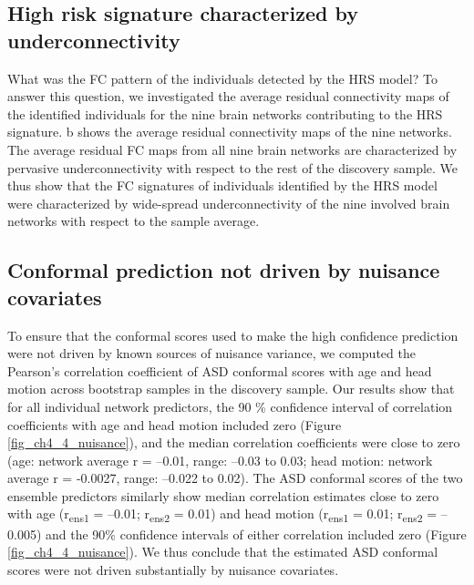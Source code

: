 \documentclass[9pt,lineno]{elife}
\begin{document}
\subsection{High risk signature characterized by underconnectivity}
What was the FC pattern of the individuals detected by the HRS model? To answer this question, we investigated the average residual connectivity maps of the identified individuals for the nine brain networks contributing to the HRS signature. b shows the average residual connectivity maps of the nine networks. The average residual FC maps from all nine brain networks are characterized by pervasive underconnectivity with respect to the rest of the discovery sample. We thus show that the FC signatures of individuals identified by the HRS model were characterized by wide-spread underconnectivity of the nine involved brain networks with respect to the sample average.

\subsection{Conformal prediction not driven by nuisance covariates}
To ensure that the conformal scores used to make the high confidence prediction were not driven by known sources of nuisance variance, we computed the Pearson’s correlation coefficient of ASD conformal scores with age and head motion across bootstrap samples in the discovery sample. Our results show that for all individual network predictors, the 90 \% confidence interval of correlation coefficients with age and head motion included zero (Figure \ref{fig_ch4_4_nuisance}), and the median correlation coefficients were close to zero (age: network average r = –0.01, range: –0.03 to 0.03; head motion: network average r = -0.0027, range: –0.022 to 0.02). The ASD conformal scores of the two ensemble predictors similarly show median correlation estimates close to zero with age (r\textsubscript{ens1} = –0.01; r\textsubscript{ens2} = 0.01) and head motion (r\textsubscript{ens1} = 0.01; r\textsubscript{ens2} = –0.005) and the 90\% confidence intervals of either correlation included zero (Figure \ref{fig_ch4_4_nuisance}). We thus conclude that the estimated ASD conformal scores were not driven substantially by nuisance covariates. 
\end{document}
